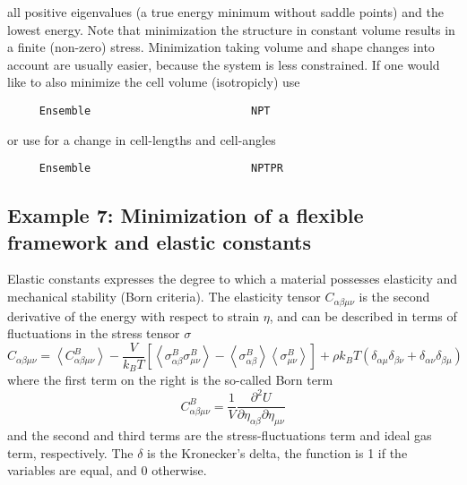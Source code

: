 all positive eigenvalues (a true energy minimum without saddle points) and the lowest energy.
Note that minimization the structure in constant volume results in a finite (non-zero) stress. Minimization taking volume and shape changes into account
are usually easier, because the system is less constrained.
If one would like to also minimize the cell volume (isotropicly) use
\begin{tiny}
\begin{verbatim}
     Ensemble                         NPT
\end{verbatim}
\end{tiny}
or use for a change in cell-lengths and cell-angles
\begin{tiny}
\begin{verbatim}
     Ensemble                         NPTPR
\end{verbatim}
\end{tiny}

\subsection*{Example 7: Minimization of a flexible framework and elastic constants}

Elastic constants expresses the degree to which a material possesses elasticity and mechanical stability (Born criteria).
The elasticity tensor $C_{\alpha\beta\mu\nu}$ is the second derivative of the energy with respect to strain $\eta$,
and can be described in terms of fluctuations
in the stress tensor $\sigma$ \cite{VanWorkum2006}
\begin{equation}
C_{\alpha\beta\mu\nu}=\left\langle C_{\alpha\beta\mu\nu}^B\right\rangle-
 \frac{V}{k_B T}\left[\left\langle\sigma_{\alpha\beta}^B\sigma_{\mu\nu}^B\right\rangle-
   \left\langle\sigma_{\alpha\beta}^B\right\rangle\left\langle\sigma_{\mu\nu}^B\right\rangle\right]
  +\rho k_B T \left(\delta_{\alpha\mu}\delta_{\beta\nu}+\delta_{\alpha\nu}\delta_{\beta\mu}\right)
 \label{Eq: stress fluctuation formula}
\end{equation}
where the first term on the right is the so-called Born term
\begin{equation}
 C_{\alpha\beta\mu\nu}^B=\frac{1}{V}\frac{\partial^2 U}{\partial \eta_{\alpha\beta}\partial \eta_{\mu\nu}}
\end{equation}
and the second and third terms are the stress-fluctuations term and ideal gas term, respectively.
The $\delta$ is the Kronecker's delta, the function is 1 if the variables are equal, and 0 otherwise.

